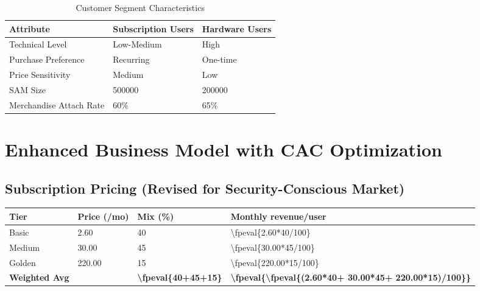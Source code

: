 \documentclass[11pt]{article}
\newcommand{\numfpeval}[1]{\num{\fpeval{#1}}}
\newcommand{\subBasicPrice}{2.60}
\newcommand{\subBasicMix}{40}
\newcommand{\subMediumPrice}{30.00}
\newcommand{\subMediumMix}{45}
\newcommand{\subGoldenPrice}{220.00}
\newcommand{\subGoldenMix}{15}
\newcommand{\subWeightedARPU}{\fpeval{(\subBasicPrice*\subBasicMix + \subMediumPrice*\subMediumMix + \subGoldenPrice*\subGoldenMix)/100}}
\newcommand{\merchAttachRate}{60}
\newcommand{\merchAttachRateBench}{65}
\newcommand{\samSubs}{500000}
\newcommand{\samHw}{200000}
\begin{document}
\begin{table}[H]
\centering
\caption{Customer Segment Characteristics}
\begin{tabularx}{\linewidth}{l X X}
\toprule
Attribute & Subscription Users & Hardware Users \\\midrule
Technical Level & Low-Medium & High \\
Purchase Preference & Recurring & One-time \\
Price Sensitivity & Medium & Low \\
SAM Size & \samSubs\cite{chainalysis2024,triple2023} & \samHw\cite{chainalysis2024,triple2023} \\
Merchandise Attach Rate & \merchAttachRate\%\cite{shopify2024} & \merchAttachRateBench\%\cite{shopify2024} \\
\bottomrule
\end{tabularx}
\end{table}

\section{Enhanced Business Model with CAC Optimization}

\subsection{Subscription Pricing (Revised for Security-Conscious Market)}
\begin{table}[H]
\centering
\begin{tabularx}{\linewidth}{l Y Y Y}
\toprule
Tier & Price (/mo) & Mix (\%) & Monthly revenue/user \\\midrule
Basic   & \subBasicPrice  & \subBasicMix & \numfpeval{\subBasicPrice*\subBasicMix/100} \\
Medium  & \subMediumPrice & \subMediumMix & \numfpeval{\subMediumPrice*\subMediumMix/100} \\
Golden  & \subGoldenPrice & \subGoldenMix & \numfpeval{\subGoldenPrice*\subGoldenMix/100} \\\midrule
\textbf{Weighted Avg} &  & \textbf{\numfpeval{\subBasicMix+\subMediumMix+\subGoldenMix}} & \textbf{\numfpeval{\subWeightedARPU}} \\
\bottomrule
\end{tabularx}
\end{table}
\end{document}

